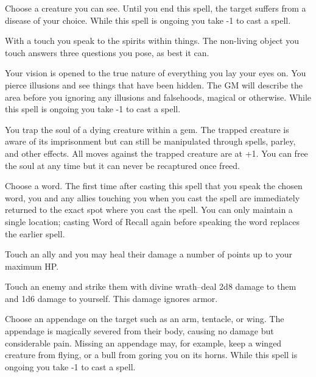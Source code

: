  Choose a creature you can see. Until you end this spell, the target suffers from a disease of your choice. While this spell is ongoing you take -1 to cast a spell.




 With a touch you speak to the spirits within things. The non-living object you touch answers three questions you pose, as best it can.





 Your vision is opened to the true nature of everything you lay your eyes on. You pierce illusions and see things that have been hidden. The GM will describe the area before you ignoring any illusions and falsehoods, magical or otherwise. While this spell is ongoing you take -1 to cast a spell.




 You trap the soul of a dying creature within a gem. The trapped creature is aware of its imprisonment but can still be manipulated through spells, parley, and other effects. All moves against the trapped creature are at +1. You can free the soul at any time but it can never be recaptured once freed.




 Choose a word. The first time after casting this spell that you speak the chosen word, you and any allies touching you when you cast the spell are immediately returned to the exact spot where you cast the spell. You can only maintain a single location; casting Word of Recall again before speaking the word replaces the earlier spell.




 Touch an ally and you may heal their damage a number of points up to your maximum HP\@.




 Touch an enemy and strike them with divine wrath--deal 2d8 damage to them and 1d6 damage to yourself. This damage ignores armor.

\newpage
{}



 Choose an appendage on the target such as an arm, tentacle, or wing. The appendage is magically severed from their body, causing no damage but considerable pain. Missing an appendage may, for example, keep a winged creature from flying, or a bull from goring you on its horns. While this spell is ongoing you take -1 to cast a spell.


